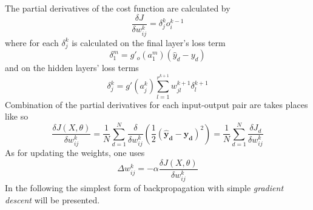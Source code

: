 The partial derivatives of the cost function are calculated by
\begin{equation}
	\label{eq:backprop_one}
	\frac{\delta J}{\delta w_{ij}^{k}} = \delta_j^k o_i^{k-1}
\end{equation}
where for each $ \delta_j^k $ is calculated on the final layer's loss term
\begin{equation}
	\label{eq:backprop_two}
	\delta_1^m = g'_o (a_1^m)(\hat{y}_d - y_d)
\end{equation}
and on the hidden layers' loss terms
\begin{equation}
	\label{eq:backprop_three}
	\delta_j^k = g'(a_j^k) \sum_{l=1}^{r^{k+1}} w_{jl}^{k+1} \delta_l^{k+1}
\end{equation}
Combination of the partial derivatives for each input-output pair are takes places like so
\begin{equation}
	\label{eq:backprop_four}
	\frac{\delta J(X, \theta)}{\delta w_{ij}^k} = \frac{1}{N} \sum_{d=1}^{N} \frac{\delta}{\delta w_{ij}^{k}} \left( \frac{1}{2} (\pmb{\hat{y}_d} - \pmb{y_d})^2 \right) = \frac{1}{N} \sum_{d=1}^{N} \frac{\delta J_d}{\delta w_{ij}^k}
\end{equation}
As for updating the weights, one uses
\begin{equation}
	\label{eq:backprop_five}
	\Delta w_{ij}^{k} = - \alpha \frac{\delta J(X, \theta)}{\delta w_{ij}^{k}}
\end{equation}
In the following the simplest form of backpropagation with simple \textit{gradient descent} will be presented.
